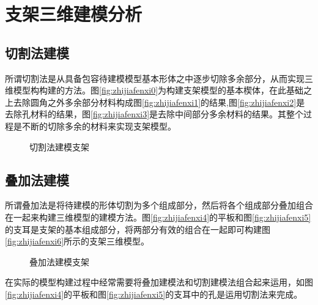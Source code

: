 \section{支架三维建模分析}

\subsection{切割法建模}
所谓切割法是从具备包容待建模模型基本形体之中逐步切除多余部分，从而实现三维模型构构建的方法。图\ref{fig:zhijiafenxi0}为构建支架模型的基本楔体，在此基础之上去除圆角之外多余部分材料构成图\ref{fig:zhijiafenxi1}的结果,图\ref{fig:zhijiafenxi2}是去除孔材料的结果，图\ref{fig:zhijiafenxi3}是去除中间部分多余材料的结果。其整个过程是不断的切除多余的材料来实现支架模型。

\begin{figure}[htbp]
\centering
{}\hspace{20pt}
\hspace{20pt}
\hspace{20pt}
\caption{切割法建模支架}
\end{figure}

\subsection{叠加法建模}

所谓叠加法是将待建模的形体切割为多个组成部分，然后将各个组成部分叠加组合在一起来构建三维模型的建模方法。图\ref{fig:zhijiafenxi4}的平板和图\ref{fig:zhijiafenxi5}的支耳是支架的基本组成部分，将两部分有效的组合在一起即可构建图\ref{fig:zhijiafenxi6}所示的支架三维模型。

\begin{figure}[htbp]
\centering
{}\hspace{20pt}
\hspace{20pt}
\caption{叠加法建模支架}
\end{figure}

在实际的模型构建过程中经常需要将叠加建模法和切割建模法组合起来运用，如图\ref{fig:zhijiafenxi4}的平板和图\ref{fig:zhijiafenxi5}的支耳中的孔是运用切割法来完成。

\endinput
